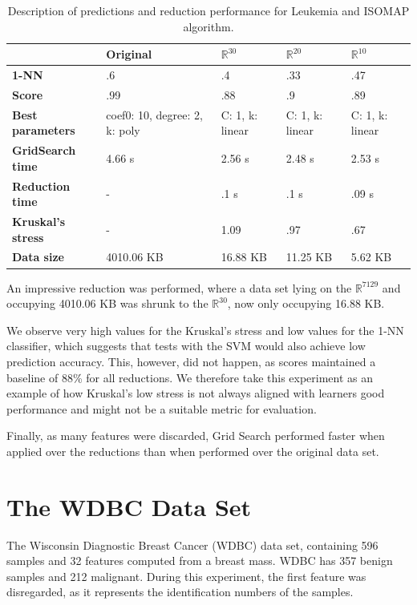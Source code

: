 \begin{table}[H]
	\centering
	
	\begin{tabular}{|p{.15\linewidth}|p{.15\linewidth}|p{.15\linewidth}|p{.15\linewidth}|p{.15\linewidth}|}
		\hline
		& \textbf{Original} & $\mathbb{R}^{30}$ & $\mathbb{R}^{20}$ & $\mathbb{R}^{10}$ \\\hline
		\textbf{1-NN} & .6 & .4 & .33 & .47\\\hline
		\textbf{Score} & .99 & .88 & .9 & .89 \\\hline
		\textbf{Best parameters} & coef0: 10, degree: 2, k: poly & C: 1, k: linear & C: 1, k: linear & C: 1, k: linear \\\hline
		\textbf{GridSearch time} & 4.66 s & 2.56 s & 2.48 s & 2.53 s \\\hline
		\textbf{Reduction time} & - & .1 s & .1 s & .09 s \\\hline
		\textbf{Kruskal's stress} & - & 1.09 & .97 & .67 \\\hline
		\textbf{Data size} & 4010.06 KB & 16.88 KB & 11.25 KB & 5.62 KB \\\hline
	\end{tabular}
	\captionsetup{justification=centering}
	\caption{Description of predictions and reduction performance for Leukemia and ISOMAP algorithm.}
\end{table}

An impressive reduction was performed, where a data set lying on the $\mathbb{R}^{7129}$ and occupying 4010.06 KB was shrunk to the $\mathbb{R}^{30}$, now only occupying 16.88 KB.

We observe very high values for the Kruskal's stress and low values for the 1-NN classifier, which suggests that tests with the SVM would also achieve low prediction accuracy. This, however, did not happen, as scores maintained a baseline of 88\% for all reductions. We therefore take this experiment as an example of how Kruskal's low stress is not always aligned with learners good performance and might not be a suitable metric for evaluation.

Finally, as many features were discarded, Grid Search performed faster when applied over the reductions than when performed over the original data set.
\clearpage

\section{The WDBC Data Set}

The Wisconsin Diagnostic Breast Cancer (WDBC) data set, containing 596 samples and 32 features computed from a breast mass. WDBC has 357 benign samples and 212 malignant. During this experiment, the first feature was disregarded, as it represents the identification numbers of the samples.
\newline\newline

